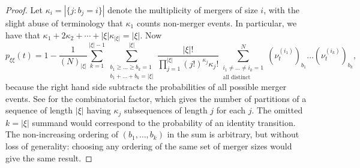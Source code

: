 \documentclass{article} %
\theoremstyle{definition}
\newcommand{\1}[1]{\mathbbm{1}_{\{#1\}}}
\begin{document}
\begin{proof}
Let $\kappa_i = |\{ j : b_j = i \}|$ denote the multiplicity of mergers of size $i$, with the slight abuse of terminology that $\kappa_1$ counts non-merger events.
In particular, we have that $\kappa_1 + 2 \kappa_2 + \cdots + | \xi | \kappa_{ | \xi | } = | \xi |$.
Now
\begin{equation*}
p_{ \xi \xi }( t ) = 1 - \frac{ 1 }{ ( N )_{ | \xi | } } \sum_{ k = 1 }^{ | \xi | - 1 } \sum_{ \substack{ b_1 \geq \ldots \geq b_k = 1 \\ b_1 + \ldots + b_k = | \xi | } }^{ | \xi | } \frac{ | \xi |! }{ \prod_{ j = 1 }^{ | \xi | } ( j ! )^{ \kappa_j } \kappa_j ! } \sum_{ \substack{ i_1 \neq \ldots \neq i_k = 1 \\ \text{all distinct} } }^N( \nu_t^{ ( i_1 ) } )_{ b_1 } \ldots ( \nu_t^{ ( i_k ) } )_{ b_k },
\end{equation*}
because the right hand side subtracts the probabilities of all possible merger events.
See \cite[Eq (11)]{fu2006} for the combinatorial factor, which gives the number of partitions of a sequence of length $|\xi|$  having $\kappa_j$ subsequences of length $j$ for each $j$.
The omitted $k = | \xi |$ summand would correspond to the probability of an identity transition.
The non-increasing ordering of $( b_1, \ldots, b_k )$ in the sum is arbitrary, but without loss of generality: choosing any ordering of the same set of merger sizes would give the same result.


\end{proof}
\end{document}
